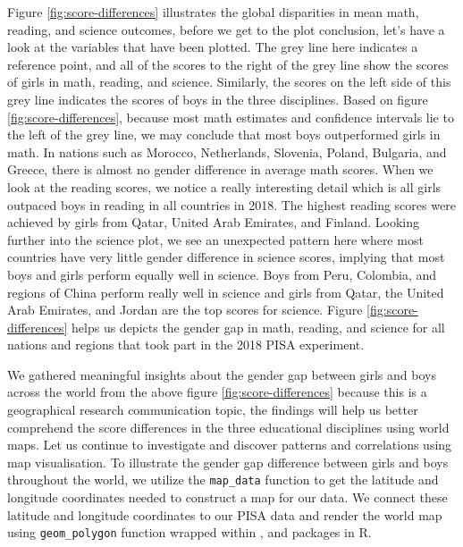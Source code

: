 Figure \ref{fig:score-differences} illustrates the global disparities in
mean math, reading, and science outcomes, before we get to the plot
conclusion, let's have a look at the variables that have been plotted.
The grey line here indicates a reference point, and all of the scores to
the right of the grey line show the scores of girls in math, reading,
and science. Similarly, the scores on the left side of this grey line
indicates the scores of boys in the three disciplines. Based on figure
\ref{fig:score-differences}, because most math estimates and confidence
intervals lie to the left of the grey line, we may conclude that most
boys outperformed girls in math. In nations such as Morocco,
Netherlands, Slovenia, Poland, Bulgaria, and Greece, there is almost no
gender difference in average math scores. When we look at the reading
scores, we notice a really interesting detail which is all girls
outpaced boys in reading in all countries in 2018. The highest reading
scores were achieved by girls from Qatar, United Arab Emirates, and
Finland. Looking further into the science plot, we see an unexpected
pattern here where most countries have very little gender difference in
science scores, implying that most boys and girls perform equally well
in science. Boys from Peru, Colombia, and regions of China perform
really well in science and girls from Qatar, the United Arab Emirates,
and Jordan are the top scores for science. Figure
\ref{fig:score-differences} helps us depicts the gender gap in math,
reading, and science for all nations and regions that took part in the
2018 PISA experiment.

We gathered meaningful insights about the gender gap between girls and
boys across the world from the above figure \ref{fig:score-differences}
because this is a geographical research communication topic, the
findings will help us better comprehend the score differences in the
three educational disciplines using world maps. Let us continue to
investigate and discover patterns and correlations using map
visualisation. To illustrate the gender gap difference between girls and
boys throughout the world, we utilize the \texttt{map\_data} function to
get the latitude and longitude coordinates needed to construct a map for
our data. We connect these latitude and longitude coordinates to our
PISA data and render the world map using \texttt{geom\_polygon} function
wrapped within  \citep{ggplot2}, 
\citep{plotly} and  \citep{patchwork} packages in R.

